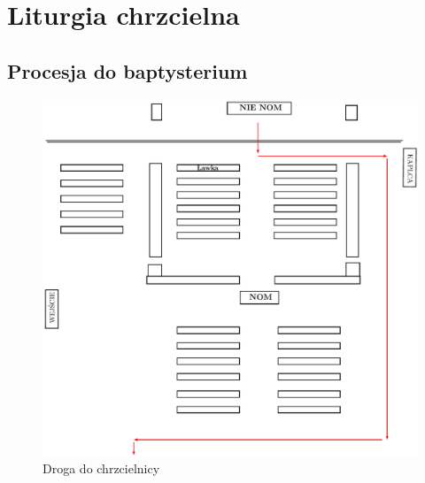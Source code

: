 \section{Liturgia chrzcielna}

\subsection{Procesja do baptysterium}
\begin{figure}[h]
	\centering
	\includegraphics[width=0.6\linewidth]{Figures/Sobota/procesja1.pdf}
	\caption{Droga do chrzcielnicy}
	\label{fig:procesja1}
\end{figure}
